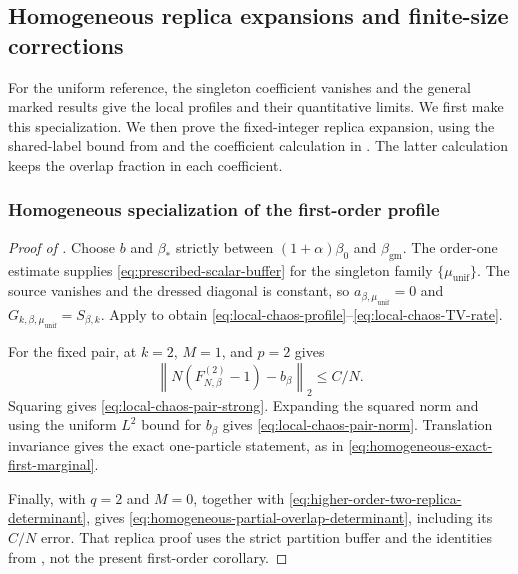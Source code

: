 \documentclass[11pt,reqno]{amsart}
\numberwithin{equation}{section}
\theoremstyle{plain}
\theoremstyle{definition}
\newcommand{\be}{\beta}
\newcommand{\muunif}{\mu_{\mathrm{unif}}}
\newcommand{\gm}{\mathrm{gm}}
\begin{document}
\subsection{Homogeneous replica expansions and finite-size corrections}
\label{sec:homogeneous-replica-chaos}

For the uniform reference, the singleton coefficient vanishes and the general marked results give the local profiles and their quantitative limits. We first make this specialization. We then prove the fixed-integer replica expansion, using the shared-label bound from  and the coefficient calculation in . The latter calculation keeps the overlap fraction in each coefficient.

\subsubsection{Homogeneous specialization of the first-order profile}

\begin{proof}[Proof of ]
Choose $b$ and $\be_*$ strictly between $(1+\alpha)\be_0$ and $\beta_{\gm}$. The order-one estimate supplies \eqref{eq:prescribed-scalar-buffer} for the singleton family $\{\muunif\}$. The source vanishes and the dressed diagonal is constant, so $a_{\be,\muunif}=0$ and $G_{k,\be,\muunif}=S_{\be,k}$. Apply  to obtain \eqref{eq:local-chaos-profile}--\eqref{eq:local-chaos-TV-rate}.

For the fixed pair,  at $k=2$, $M=1$, and $p=2$ gives
\begin{equation}
 \left\|N(F_{N,\be}^{(2)}-1)-b_\be\right\|_2\leq C/N.
 \label{eq:homogeneous-pair-from-marked}
\end{equation}
Squaring gives \eqref{eq:local-chaos-pair-strong}. Expanding the squared norm and using the uniform $L^2$ bound for $b_\be$ gives \eqref{eq:local-chaos-pair-norm}. Translation invariance gives the exact one-particle statement, as in \eqref{eq:homogeneous-exact-first-marginal}.

Finally,  with $q=2$ and $M=0$, together with \eqref{eq:higher-order-two-replica-determinant}, gives \eqref{eq:homogeneous-partial-overlap-determinant}, including its $C/N$ error. That replica proof uses the strict partition buffer and the identities from , not the present first-order corollary.
\end{proof}
\end{document}
